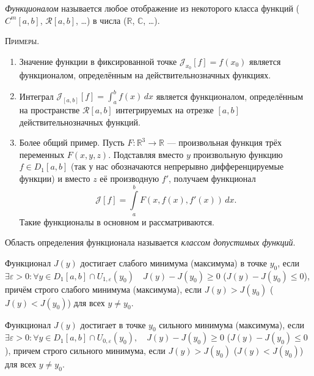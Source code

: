 
\begin{definition}
	\emph{Функционалом}
	называется любое отображение из некоторого класса функций ($ C^m[a, b] $, $
	\mathscr R[a,b] $, \ldots) в числа
	($ \mathbb R $, $ \mathbb C $, \ldots). 
\end{definition}

\textsc{Примеры.}
\begin{enumerate}
	\item Значение функции в фиксированной точке $ \mathscr{J}_{x_0}[f] = f(x_0) $
	является функционалом, определённым на действительнозначных функциях.
	\item\label{enum1:2} Интеграл $ \mathscr{J}_{[a,b]}[f] = \int_{a}^{b} f(x)\,dx $ является
	функционалом, определённым на пространстве $ \mathscr{R}[a,b] $
	интегрируемых на отрезке $ [a,b] $ действительнозначных функций.
	\item Более общий пример. Пусть $ F\colon \mathbb R^3 \to \mathbb R $ ---
	произвольная функция трёх переменных $ F(x, y, z) $. Подставляя вместо $ y $
	произвольную функцию $ f \in D_1[a, b] $ (так у нас обозначаются непрерывно
	дифференцируемые функции) и вместо $ z $ её производную $ f'
	$, получаем функционал  
	\[
	\mathscr{J}[f] = \int\limits_{a}^{b}F(x, f(x), f'(x))\,dx.
	\]
	Такие функционалы в основном и рассматриваются. 
\end{enumerate}

\begin{definition}
	Область определения функционала называется \textit{классом допустимых функций}.
\end{definition}

\begin{definition}
	Функционал $J(y)$ достигает слабого минимума (максимума) в точке $y_0$, если $\exists \varepsilon > 0 : \forall y \in D_1[a, b] \cap U_{1, \varepsilon}(y_0) \quad J(y) - J(y_0) \geqslant 0$ ($J(y) - J(y_0) \leqslant 0$), причём строго слабого минимума (максимума), если $J(y) > J(y_0)$ ($J(y) < J(y_0)$) для всех $y \not = y_0$.
\end{definition}

\begin{definition}
	Функционал $J(y)$ достигает в точке $y_0$ сильного минимума (максимума), если $\exists \varepsilon > 0 : \forall y \in D_1[a, b] \cap U_{0, \varepsilon}(y_0), \quad J(y) - J(y_0) \geqslant 0$ ($J(y) - J(y_0) \leqslant 0$), причем строго сильного минимума, если $J(y) > J(y_0)$ ($J(y) < J(y_0)$) для всех $y \not = y_0$. 
\end{definition}

